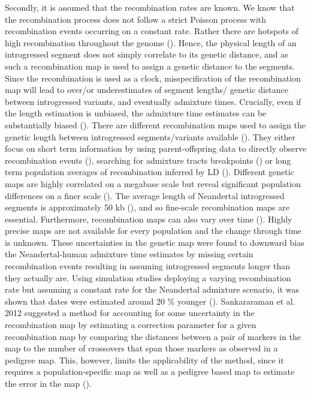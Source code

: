 \documentclass[]{article}
\begin{document}
Secondly, it is assumed that the recombination rates are known. We know
that the recombination process does not follow a strict Poisson process
with recombination events occurring on a constant rate. Rather there are
hotspots of high recombination throughout the genome
(\cite{mcvean_fine-scale_2004}). Hence, the physical length of an
introgressed segment does not simply correlate to its genetic distance,
and as such a recombination map is used to assign a genetic distance to
the segments. Since the recombination is used as a clock,
misspecification of the recombination map will lead to over/or
underestimates of segment lengths/ genetic distance between introgressed
variants, and eventually admixture times. Crucially, even if the length estimation
is unbiased, the admixture time estimates can be substantially biased
(\cite{sankararaman_date_2012,fu_genome_2014}).
There are different
recombination maps used to assign the genetic length between
introgressed segments/variants available
(\cite{coop_high-resolution_2008,kong_fine-scale_2010,hinch_landscape_2011,wegmann_recombination_2011,mcvean_fine-scale_2004,myers_fine-scale_2005,HapMapConsortium_second_2007}). They either focus on short term information by using parent-offspring
data to directly observe recombination events
(\cite{coop_high-resolution_2008,kong_fine-scale_2010}), searching for
admixture tracts breakpoints
(\cite{hinch_landscape_2011,wegmann_recombination_2011}) or long term
population averages of recombination inferred by LD
(\cite{mcvean_fine-scale_2004,myers_fine-scale_2005,HapMapConsortium_second_2007}).
Different genetic maps are highly correlated on a megabase scale but
reveal significant population differences on a finer scale
(\cite{kong_fine-scale_2010,hinch_landscape_2011}). The average length
of Neandertal introgressed segments is approximately 50 kb
(\cite{sankararaman_date_2012,vernot_resurrecting_2014}), and so
fine-scale recombination maps are essential. Furthermore, recombination
maps can also vary over time (\cite{auton_fine-scale_2012}). Highly
precise maps are not available for every population and the change
through time is unknown. These uncertainties in the genetic map were
found to downward bias the Neandertal-human admixture time estimates by
missing certain recombination events resulting in assuming introgressed
segments longer than they actually are. Using simulation studies
deploying a varying recombination rate but assuming a constant rate for
the Neandertal admixture scenario, it was shown that dates were
estimated around 20 \% younger (\cite{sankararaman_date_2012}).
Sankararaman et al. 2012 suggested a method for accounting for some
uncertainty in the recombination map by estimating a correction
parameter for a given recombination map by comparing the distances
between a pair of markers in the map to the number of crossovers that
span those markers as observed in a pedigree map. This, however, limits
the applicability of the method, since it requires a population-specific
map as well as a pedigree based map to estimate the error in the map
(\cite{sankararaman_date_2012,fu_genome_2014,sankararaman_combined_2016,moorjani_genetic_2016}).
\end{document}
